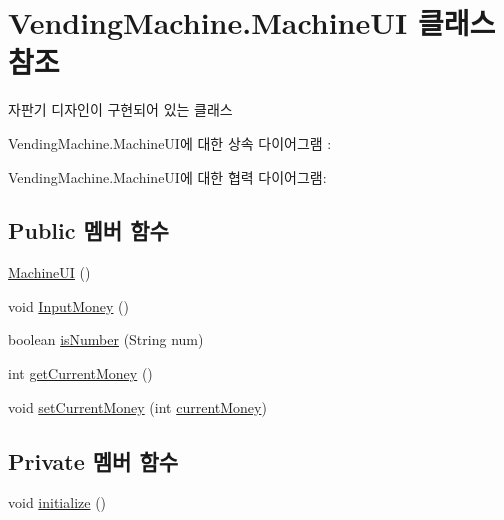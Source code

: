 \hypertarget{class_vending_machine_1_1_machine_u_i}{}\section{Vending\+Machine.\+Machine\+UI 클래스 참조}
\label{class_vending_machine_1_1_machine_u_i}


자판기 디자인이 구현되어 있는 클래스  




Vending\+Machine.\+Machine\+U\+I에 대한 상속 다이어그램 \+: 


Vending\+Machine.\+Machine\+U\+I에 대한 협력 다이어그램\+:
\subsection*{Public 멤버 함수}
\begin{DoxyCompactItemize}
\item 
\hyperlink{class_vending_machine_1_1_machine_u_i_a3c614e330b9975abf0909d61b694f8d9}{Machine\+UI} ()
\item 
void \hyperlink{class_vending_machine_1_1_machine_u_i_ab1450eb783629d05001682ac0c8c30e0}{Input\+Money} ()
\item 
boolean \hyperlink{class_vending_machine_1_1_machine_u_i_a7f5aa2e1b49c150c3b479b7e5123cf25}{is\+Number} (String num)
\item 
int \hyperlink{class_vending_machine_1_1_machine_u_i_ac20d119ef94a8d37a9436ac674afacf0}{get\+Current\+Money} ()
\item 
void \hyperlink{class_vending_machine_1_1_machine_u_i_ae78b7b80aafcb8f1958c5d06c05b9b99}{set\+Current\+Money} (int \hyperlink{class_vending_machine_1_1_machine_u_i_ab9b12975e6462529e3abda75e7ebf272}{current\+Money})
\end{DoxyCompactItemize}
\subsection*{Private 멤버 함수}
\begin{DoxyCompactItemize}
\item 
void \hyperlink{class_vending_machine_1_1_machine_u_i_a0998e5d4dd6366bc51386358d9b24edc}{initialize} ()
\end{DoxyCompactItemize}
